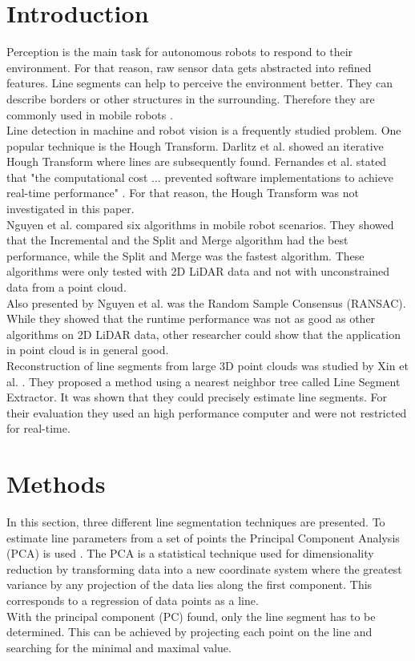 \documentclass{scp}
\begin{document}
\section{Introduction} 
\thispagestyle{empty}
Perception is the main task for autonomous robots to respond to their environment. For that reason, raw sensor data gets abstracted into refined features. Line segments can help to perceive the environment better. They can describe borders or other structures in the surrounding. Therefore they are commonly used in mobile robots \cite{Zhang}. \\
Line detection in machine and robot vision is a frequently studied problem. One popular technique is the Hough Transform. Darlitz et al. \cite{Dalitz} showed an iterative Hough Transform where lines are subsequently found. Fernandes et al. stated that "the computational cost ... prevented software implementations to achieve real-time performance" \cite{Fernandes}. For that reason, the Hough Transform was not investigated in this paper. \\
Nguyen et al. \cite{Nguyen} compared six algorithms in mobile robot scenarios. They showed that the Incremental and the Split and Merge algorithm had the best performance, while the Split and Merge was the fastest algorithm. These algorithms were only tested with 2D LiDAR data and not with unconstrained data from a point cloud. \\
Also presented by Nguyen et al. was the Random Sample Consensus (RANSAC). While they showed that the runtime performance was not as good as other algorithms on 2D LiDAR data, other researcher could show that the application in point cloud is in general good.\\
Reconstruction of line segments from large 3D point clouds was studied by Xin et al. \cite{Xin}. They proposed a method using a nearest neighbor tree called Line Segment Extractor. It was shown that they could precisely estimate line segments. For their evaluation they used an high performance computer and were not restricted for real-time.   

\section{Methods} 
In this section, three different line segmentation techniques are presented. To estimate line parameters from a set of points the Principal Component Analysis (PCA) is used \cite{pca}. The PCA is a statistical technique used for dimensionality reduction by transforming data into a new coordinate system where the greatest variance by any projection of the data lies along the first component. This corresponds to a regression of data points as a line.\\
With the principal component (PC) found, only the line segment has to be determined. This can be achieved by projecting each point on the line and searching for the minimal and maximal value.
\end{document}

